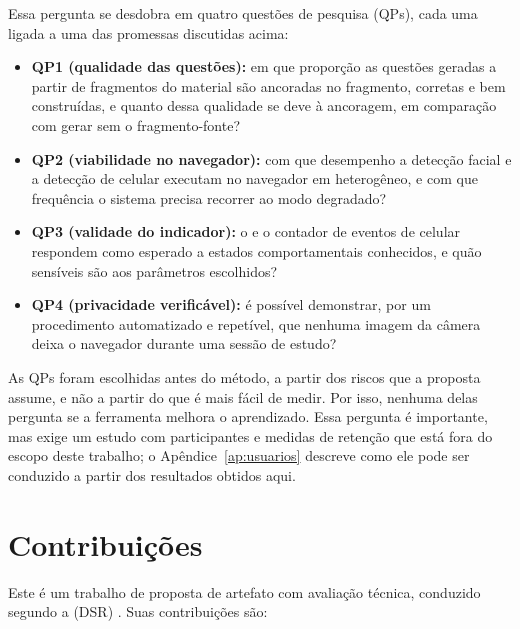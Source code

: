 Essa pergunta se desdobra em quatro questões de pesquisa (QPs), cada uma ligada a uma das promessas discutidas acima:

\begin{itemize}
  \item \textbf{QP1 (qualidade das questões):} em que proporção as questões geradas a partir de fragmentos do material são ancoradas no fragmento, corretas e bem construídas, e quanto dessa qualidade se deve à ancoragem, em comparação com gerar sem o fragmento-fonte?
  \item \textbf{QP2 (viabilidade no navegador):} com que desempenho a detecção facial e a detecção de celular executam no navegador em  heterogêneo, e com que frequência o sistema precisa recorrer ao modo degradado?
  \item \textbf{QP3 (validade do indicador):} o \fs e o contador de eventos de celular respondem como esperado a estados comportamentais conhecidos, e quão sensíveis são aos parâmetros escolhidos?
  \item \textbf{QP4 (privacidade verificável):} é possível demonstrar, por um procedimento automatizado e repetível, que nenhuma imagem da câmera deixa o navegador durante uma sessão de estudo?
\end{itemize}

As QPs foram escolhidas antes do método, a partir dos riscos que a proposta assume, e não a partir do que é mais fácil de medir. Por isso, nenhuma delas pergunta se a ferramenta melhora o aprendizado. Essa pergunta é importante, mas exige um estudo com participantes e medidas de retenção que está fora do escopo deste trabalho; o Apêndice~\ref{ap:usuarios} descreve como ele pode ser conduzido a partir dos resultados obtidos aqui.

\section{Contribuições}

Este é um trabalho de proposta de artefato com avaliação técnica, conduzido segundo a  (DSR) \cite{HMPR04}. Suas contribuições são:

